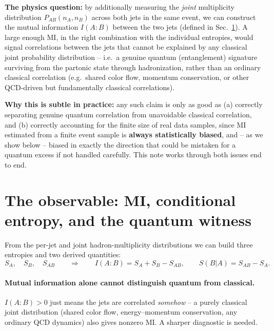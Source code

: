 \documentclass[11pt]{article}
\newcommand{\SBA}{S(B|A)}
\begin{document}
\textbf{The physics question:} by additionally measuring the \emph{joint}
multiplicity distribution $P_{AB}(n_A,n_B)$ across both jets in the same
event, we can construct the mutual information $I(A{:}B)$ between the two
jets (defined in Sec.~\ref{sec:observable}). A large enough MI, in the
right combination with the individual entropies, would signal
correlations between the jets that cannot be explained by any classical
joint probability distribution -- i.e.\ a genuine quantum (entanglement)
signature surviving from the partonic state through hadronization, rather
than an ordinary classical correlation (e.g.\ shared color flow, momentum
conservation, or other QCD-driven but fundamentally classical
correlations).

\textbf{Why this is subtle in practice:} any such claim is only as good as
(a) correctly separating genuine quantum correlation from unavoidable
classical correlation, and (b) correctly accounting for the finite size of
real data samples, since MI estimated from a finite event sample is
\textbf{always statistically biased}, and -- as we show below -- biased in
exactly the direction that could be mistaken for a quantum excess if not
handled carefully. This note works through both issues end to end.

\section{The observable: MI, conditional entropy, and the quantum witness}
\label{sec:observable}

From the per-jet and joint hadron-multiplicity distributions we can build
three entropies and two derived quantities:
\begin{equation}
S_A,\quad S_B,\quad S_{AB}
\qquad\Longrightarrow\qquad
I(A{:}B) = S_A+S_B-S_{AB},
\qquad
\SBA = S_{AB}-S_A .
\end{equation}

\paragraph{Mutual information alone cannot distinguish quantum from
classical.} $I(A{:}B)>0$ just means the jets are correlated \emph{somehow}
-- a purely classical joint distribution (shared color flow,
energy--momentum conservation, any ordinary QCD dynamics) also gives
nonzero MI. A sharper diagnostic is needed.
\end{document}
